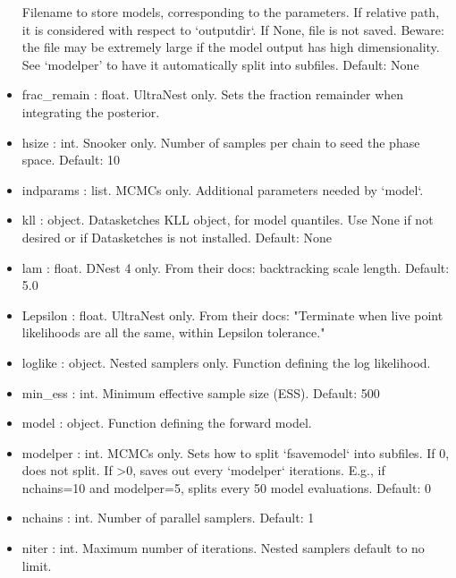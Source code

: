 \documentclass[letterpaper, 12pt]{article}
\begin{document}
\begin{itemize}
                        Filename to store models, corresponding to  
                        the parameters. If relative path, it is  
                        considered with respect to `outputdir`.   
                        If None, file is not saved.   
                        Beware: the file may be extremely large  
                        if the model output has high dimensionality. 
                        See `modelper' to have it automatically split into 
                        subfiles.
                        Default: None
\item frac\_remain : float. UltraNest only. Sets the fraction  
                            remainder when integrating the posterior.
\item hsize : int. Snooker only. Number of samples per chain to seed the 
                   phase space.  Default: 10
\item indparams : list. MCMCs only. Additional parameters needed by `model`.
\item kll : object.  Datasketches KLL object, for model quantiles.  
                     Use None if not desired or if Datasketches is  
                     not installed.  Default: None
\item lam : float. DNest 4 only. From their docs: backtracking scale 
                   length.  Default: 5.0
\item Lepsilon : float. UltraNest only. From their docs: "Terminate  
                        when live point likelihoods are all the same,  
                        within Lepsilon tolerance."
\item loglike : object. Nested samplers only.  Function defining the log 
                        likelihood.
\item min\_ess : int. Minimum effective sample size (ESS). Default: 500
\item model : object. Function defining the forward model.
\item modelper : int. MCMCs only. Sets how to split `fsavemodel` 
                      into subfiles.   
                      If 0, does not split.  If >0, saves out every  
                      `modelper` iterations.  E.g., if nchains=10 and  
                      modelper=5, splits every 50 model evaluations.   
                      Default: 0
\item nchains : int. Number of parallel samplers. Default: 1
\item niter : int. Maximum number of iterations.  Nested samplers  
                       default to no limit.

\end{itemize}
\end{document}
